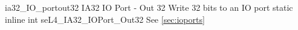 %
%
%
%

\apidoc
{ia32_IO_portout32}
{IA32 IO Port - Out 32}
{Write 32 bits to an IO port}
{static inline int seL4\_IA32\_IOPort\_Out32 }
{
}
{\errorenumdesc}
{See \autoref{sec:ioports}}
